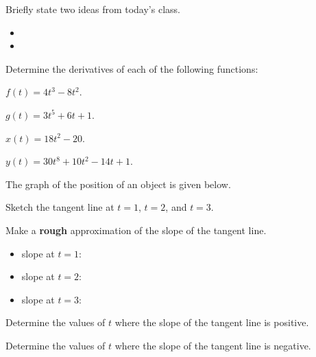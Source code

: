\postClass

\begin{problem}
\item Briefly state two ideas from today's class.
  \begin{itemize}
  \item
  \item
  \end{itemize}
  \item Determine the derivatives of each of the following functions:
    \begin{subproblem}
    \item $f(t)=4t^3-8t^2$.
      \vfill
    \item $g(t)=3t^5+6t + 1$.
      \vfill
    \item $x(t)=18t^2-20$.
      \vfill
    \item $y(t)=30t^8+10t^2 - 14 t + 1$.
      \vfill
  \end{subproblem}

\end{problem}




\begin{problem}
\item The graph of the position of an object is given below.

  \scalebox{0.6}{}

  \begin{subproblem}
  \item Sketch the tangent line at $t=1$, $t=2$, and $t=3$.
  \item Make a \textbf{rough} approximation of the slope of the tangent line.
    \begin{itemize}
    \item slope at $t=1$:
    \item slope at $t=2$:
    \item slope at $t=3$:
    \end{itemize}
  \item Determine the values of $t$ where the slope of the tangent line is positive.
    \vfill
  \item Determine the values of $t$ where the slope of the tangent line is negative.
    \vfill
  \end{subproblem}

\end{problem}


